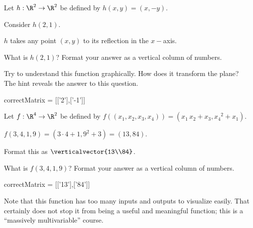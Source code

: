 \documentclass{ximera}
\begin{document}
\begin{question}
  Let $h:\R^2 \to \R^2$ be defined by $h(x,y) = (x,-y)$.
  \begin{solution}
    \begin{hint}
      Consider $h(2,1)$.
    \end{hint}
    \begin{hint}
    \end{hint}
    \begin{hint}
      $h$ takes any point $(x,y)$ to its reflection in the $x-$axis.
    \end{hint}
    
    What is $h(2,1)$?  Format your answer as a vertical column of numbers.
    
    Try to understand this function graphically.  How does it transform the plane?  The hint reveals the answer to this question.
    
    \begin{matrix-answer}
      correctMatrix = [['2'],['-1']]
    \end{matrix-answer}
  \end{solution}
  
\end{question}
  
\begin{question}
  Let $f:\R^4 \to \R^2$ be defined by $f((x_1,x_2,x_3,x_4)) = (x_1 \, x_2+x_3,{x_4}^2+x_1)$.
  \begin{solution}
    \begin{hint}
      $f(3,4,1,9) = (3\cdot 4+1,9^2+3) = (13,84)$.
    \end{hint}
    \begin{hint}
      Format this as $\verticalvector{13\\84}$.
    \end{hint}
    What is $f(3,4,1,9)$? Format your answer as a vertical column of numbers.
    \begin{matrix-answer}
      correctMatrix = [['13'],['84']]
    \end{matrix-answer}
  \end{solution}

  Note that this function has too many inputs and outputs to visualize
  easily.  That certainly does not stop it from being a useful and meaningful
  function; this is a ``massively multivariable'' course.
\end{question}
\end{document}
